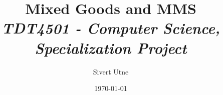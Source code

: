 


\begin{titlingpage}
    \title{
        \textbf{Mixed Goods and MMS}\\
        \textit{\normalsize{TDT4501 - Computer Science, Specialization Project}}\\
    }
    \author{Sivert Utne}
    \date{\today}
    \maketitle
\end{titlingpage}



\newpage
\tableofcontents
\listoffigures
\listoftables

\newpage
{}  %



\newpage
{}



